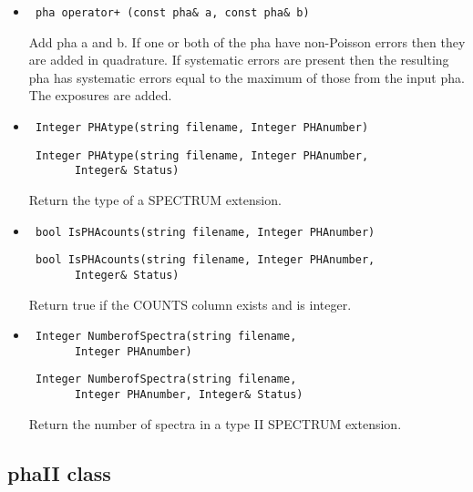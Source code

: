 \documentclass[11pt]{book}
\begin{document}
\begin{itemize}

\item  \begin{verbatim} pha operator+ (const pha& a, const pha& b) \end{verbatim}

          Add pha a and b. If one or both of the pha have
          non-Poisson errors then they are added in quadrature. If
          systematic errors are present then the resulting pha has
          systematic errors equal to the maximum of those from the
          input pha. The exposures are added.

\item  \begin{verbatim} Integer PHAtype(string filename, Integer PHAnumber) \end{verbatim}
       \begin{verbatim} Integer PHAtype(string filename, Integer PHAnumber, 
       Integer& Status) \end{verbatim}

          Return the type of a SPECTRUM extension.

\item  \begin{verbatim} bool IsPHAcounts(string filename, Integer PHAnumber) \end{verbatim}
       \begin{verbatim} bool IsPHAcounts(string filename, Integer PHAnumber, 
       Integer& Status) \end{verbatim}

          Return true if the COUNTS column exists and is integer.

\item  \begin{verbatim} Integer NumberofSpectra(string filename, 
       Integer PHAnumber) \end{verbatim}
       \begin{verbatim} Integer NumberofSpectra(string filename, 
       Integer PHAnumber, Integer& Status) \end{verbatim}

          Return the number of spectra in a type II SPECTRUM extension.

\end{itemize}

  
\subsection{phaII class}
\end{document}
